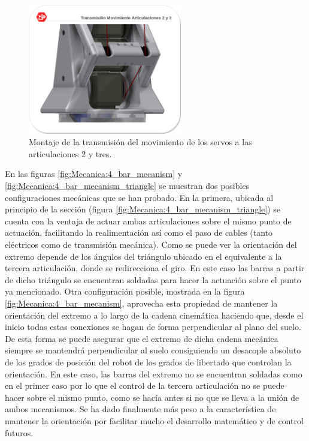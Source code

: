    	\begin{figure}[H]
   		\centering
   		\includegraphics[width=0.6\textwidth]{figuras/Imagenes_Mecanica/TransmisionMotorArticulacion.png}   
   		\caption{Montaje de la transmisión del movimiento de los servos a las articulaciones 2 y tres.}
   		\label{fig:Mecanica:transmision_poleas_cuerda}
   	\end{figure}
   	
   	En las figuras \ref{fig:Mecanica:4_bar_mecanism} y \ref{fig:Mecanica:4_bar_mecanism_triangle} se muestran dos posibles configuraciones mecánicas que se han probado. En la primera, ubicada al principio de la sección (figura \ref{fig:Mecanica:4_bar_mecanism_triangle}) se cuenta con la ventaja de actuar ambas articulaciones sobre el mismo punto de actuación, facilitando la realimentación así como el paso de cables (tanto eléctricos como de transmisión mecánica). Como se puede ver la orientación del extremo depende de los ángulos del triángulo ubicado en el equivalente a la tercera articulación, donde se redirecciona el giro. En este caso las barras a partir de dicho triángulo se encuentran soldadas para hacer la actuación sobre el punto ya mencionado. Otra configuración posible, mostrada en la figura \ref{fig:Mecanica:4_bar_mecanism}, aprovecha esta propiedad de mantener la orientación del extremo a lo largo de la cadena cinemática haciendo que, desde el inicio todas estas conexiones se hagan de forma perpendicular al plano del suelo. De esta forma se puede asegurar que el extremo de dicha cadena mecánica siempre se mantendrá perpendicular al suelo consiguiendo un desacople absoluto de los grados de posición del robot de los grados de libertado que controlan la orientación. En este caso, las barras del extremo no se encuentran soldadas como en el primer caso por lo que el control de la tercera articulación no se puede hacer sobre el mismo punto, como se hacía antes si no que se lleva a la unión de ambos mecanismos. Se ha dado finalmente más peso a la característica de mantener la orientación por facilitar mucho el desarrollo matemático y de control futuros.

